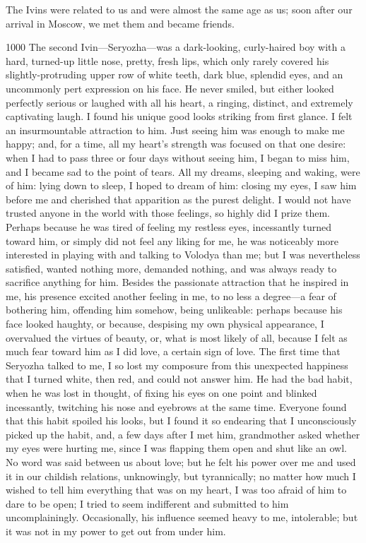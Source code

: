 The Ivins were related to us and were almost the same age as us; soon after our arrival in Moscow, we met them and became friends.

\begin{tolerant}{1000}
The second Ivin---Seryozha---was a dark-looking, curly-haired boy with a hard, turned-up little nose, pretty, fresh lips, which only rarely covered his slightly-protruding upper row of white teeth, dark blue, splendid eyes, and an uncommonly pert expression on his face. He never smiled, but either looked perfectly serious or laughed with all his heart, a ringing, distinct, and extremely captivating laugh. I found his unique good looks striking from first glance. I felt an insurmountable attraction to him. Just seeing him was enough to make me happy; and, for a time, all my heart's strength was focused on that one desire: when I had to pass three or four days without seeing him, I began to miss him, and I became sad to the point of tears. All my dreams, sleeping and waking, were of him: lying down to sleep, I hoped to dream of him: closing my eyes, I saw him before me and cherished that apparition as the purest delight. I would not have trusted anyone in the world with those feelings, so highly did I prize them. Perhaps because he was tired of feeling my restless eyes, incessantly turned toward him, or simply did not feel any liking for me, he was noticeably more interested in playing with and talking to Volodya than me; but I was nevertheless satisfied, wanted nothing more, demanded nothing, and was always ready to sacrifice anything for him. Besides the passionate attraction that he inspired in me, his presence excited another feeling in me, to no less a degree---a fear of bothering him, offending him somehow, being unlikeable: perhaps because his face looked haughty, or because, despising my own physical appearance, I overvalued the virtues of beauty, or, what is most likely of all, because I felt as much fear toward him as I did love, a certain sign of love. The first time that Seryozha talked to me, I so lost my composure from this unexpected happiness that I turned white, then red, and could not answer him. He had the bad habit, when he was lost in thought, of fixing his eyes on one point and blinked incessantly, twitching his nose and eyebrows at the same time. Everyone found that this habit spoiled his looks, but I found it so endearing that I unconsciously picked up the habit, and, a few days after I met him, grandmother asked whether my eyes were hurting me, since I was flapping them open and shut like an owl. No word was said between us about love; but he felt his power over me and used it in our childish relations, unknowingly, but tyrannically; no matter how much I wished to tell him everything that was on my heart, I was too afraid of him to dare to be open; I tried to seem indifferent and submitted to him uncomplainingly. Occasionally, his influence seemed heavy to me, intolerable; but it was not in my power to get out from under him.
\end{tolerant}

